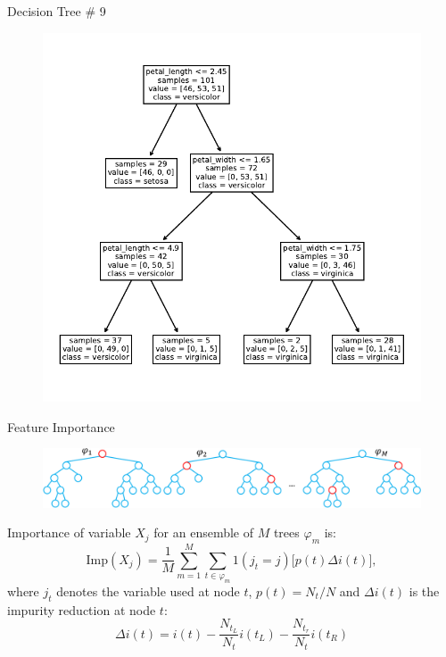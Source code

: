 \documentclass{beamer}
\begin{document}
\begin{frame}{Decision Tree \# 9}
\begin{figure}
\includegraphics[scale=0.7]{tree-9.pdf}
\end{figure}
\end{frame}

\begin{frame}{Feature Importance\footnotemark}
\begin{figure}
	\includegraphics[scale=0.4]{mdi.pdf}
\end{figure}
Importance of variable $X_j$ for an ensemble of $M$ trees $\varphi_{m}$ is:
\begin{equation*}
\text{Imp}(X_j) = \frac{1}{M} \sum_{m=1}^M \sum_{t \in \varphi_{m}} 1(j_t = j) \Big[ p(t) \Delta i(t) \Big],
\end{equation*}
where $j_t$ denotes the variable used at node $t$, $p(t)=N_t/N$ and $\Delta i(t)$ is the impurity reduction at node $t$:
\begin{equation*}
\Delta i(t) = i(t) - \frac{N_{t_L}}{N_t} i(t_L) - \frac{N_{t_r}}{N_t} i(t_R)
\end{equation*}

\end{frame}
\end{document}

